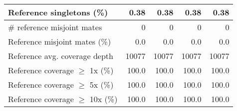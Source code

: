 \documentclass[12pt,a4paper]{article}
\begin{document}
\begin{table}[ht]
\begin{center}
\begin{tabular}{|l*{4}{|r}|}
Reference singletons (\%) & 0.38 & 0.38 & 0.38 & 0.38 \\ \hline
\# reference misjoint mates & 0 & 0 & 0 & 0 \\ \hline
Reference misjoint mates (\%) & 0.0 & 0.0 & 0.0 & 0.0 \\ \hline
Reference avg. coverage depth & 10077 & 10077 & 10077 & 10077 \\ \hline
Reference coverage $\geq$ 1x (\%) & 100.0 & 100.0 & 100.0 & 100.0 \\ \hline
Reference coverage $\geq$ 5x (\%) & 100.0 & 100.0 & 100.0 & 100.0 \\ \hline
Reference coverage $\geq$ 10x (\%) & 100.0 & 100.0 & 100.0 & 100.0 \\ \hline
\end{tabular}
\end{center}
\end{table}
\end{document}
